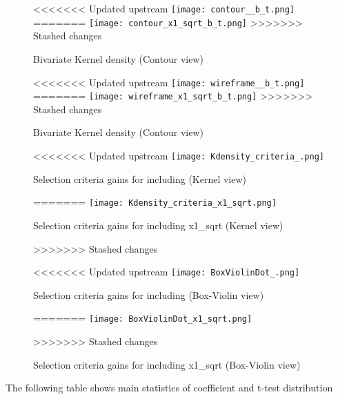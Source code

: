 \documentclass{article}
\begin{document}
\begin{figure}[!ht]
  \centering
  \begin{minipage}[b]{0.46\textwidth}
    \centering
<<<<<<< Updated upstream
    \texttt{[image: contour\_\_b\_t.png]}
=======
    \texttt{[image: contour\_x1\_sqrt\_b\_t.png]}
>>>>>>> Stashed changes
    \caption{Bivariate Kernel density (Contour view)}
  \end{minipage}
  \hfill
  \begin{minipage}[b]{0.53\textwidth}
    \centering
<<<<<<< Updated upstream
    \texttt{[image: wireframe\_\_b\_t.png]}
=======
    \texttt{[image: wireframe\_x1\_sqrt\_b\_t.png]}
>>>>>>> Stashed changes
    \caption{Bivariate Kernel density (Contour view)}
  \end{minipage}

  \begin{minipage}[b]{0.48\textwidth}
    \centering
<<<<<<< Updated upstream
    \texttt{[image: Kdensity\_criteria\_.png]}
    \caption{Selection criteria gains for including  (Kernel view)}
=======
    \texttt{[image: Kdensity\_criteria\_x1\_sqrt.png]}
    \caption{Selection criteria gains for including x1_sqrt (Kernel view)}
>>>>>>> Stashed changes
  \end{minipage}
  \hfill
  \begin{minipage}[b]{0.48\textwidth}
    \centering    
<<<<<<< Updated upstream
    \texttt{[image: BoxViolinDot\_.png]}
    \caption{Selection criteria gains for including  (Box-Violin view)}    
=======
    \texttt{[image: BoxViolinDot\_x1\_sqrt.png]}
    \caption{Selection criteria gains for including x1_sqrt (Box-Violin view)}    
>>>>>>> Stashed changes
  \end{minipage}
\end{figure}

\vspace{1cm}

The following table shows main statistics of coefficient and t-test distribution 
\end{document}
